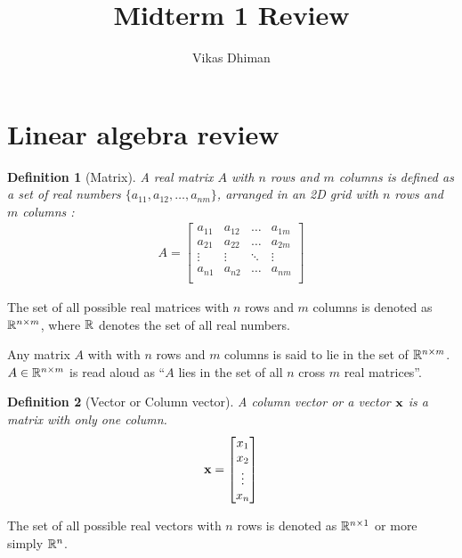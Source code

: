 \documentclass{article}
\title{Midterm 1  Review}
\author{Vikas  Dhiman}
\newtheorem{defn}{Definition}
\begin{document}
\maketitle

\tableofcontents
\section{Linear algebra   review}
\begin{defn}[Matrix] A  real  matrix  $A$ with $n$ rows  and  $m$  columns is defined as a  set  of real numbers  $\{a_{11}, a_{12},
\dots,     a_{nm}\}$, arranged in
an 2D grid with $n$  rows  and $m$  columns :
\begin{align}
  A  =  \begin{bmatrix}
    a_{11}  &  a_{12} &   \dots &  a_{1m} \\
    a_{21}  &  a_{22} &   \dots &  a_{2m} \\
    \vdots  & \vdots &   \ddots  &  \vdots   \\
    a_{n1}  &  a_{n2} &   \dots &  a_{nm} \\
    \end{bmatrix}
\end{align}
\end{defn}

The set of all possible real  matrices with  $n$ rows   and   $m$  columns  is
denoted  as $\mathbb{R}^{n \times   m}$, where  $\mathbb{R}$ denotes  the set  of all real numbers.

Any matrix $A$ with with  $n$  rows  and  $m$  columns  is   said  to lie  in
the  set  of $\mathbb{R}^{n \times   m}$. $A \in \mathbb{R}^{n \times m}$  is  read aloud
as ``$A$  lies  in   the set of all $n$ cross $m$  real matrices''.

\begin{defn}[Vector  or Column vector]
  A column vector or a vector $\mathbf{x}$ is a matrix  with only one column.
  \begin{align}
    \mathbf{x}  =  \begin{bmatrix}
      x_{1} \\
      x_{2} \\
      \vdots   \\
      x_{n} \\
    \end{bmatrix}
  \end{align}
\end{defn}

The set of all possible real  vectors with  $n$ rows   is
denoted  as $\mathbb{R}^{n \times   1}$ or more simply $\mathbb{R}^{n}$.
\end{document}
